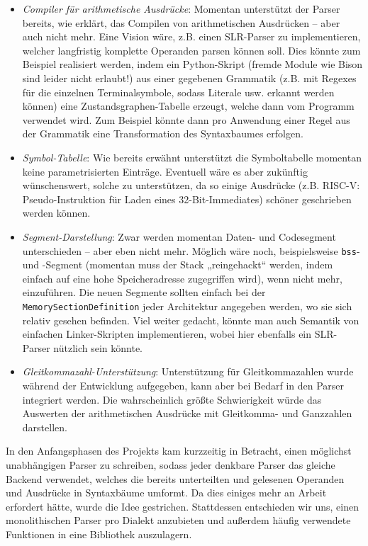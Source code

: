 \begin{itemize}
\item \emph{Compiler für arithmetische Ausdrücke}: Momentan unterstützt der Parser bereits, wie erklärt, das Compilen von arithmetischen Ausdrücken – aber auch nicht mehr. Eine Vision wäre, z.B. einen SLR-Parser zu implementieren, welcher langfristig komplette Operanden parsen können soll. Dies könnte zum Beispiel realisiert werden, indem ein Python-Skript (fremde Module wie Bison sind leider nicht erlaubt!) aus einer gegebenen Grammatik (z.B. mit Regexes für die einzelnen Terminalsymbole, sodass Literale usw. erkannt werden können) eine Zustandsgraphen-Tabelle erzeugt, welche dann vom Programm verwendet wird. Zum Beispiel könnte dann pro Anwendung einer Regel aus der Grammatik eine Transformation des Syntaxbaumes erfolgen.
\item \emph{Symbol-Tabelle}: Wie bereits erwähnt unterstützt die Symboltabelle momentan keine parametrisierten Einträge. Eventuell wäre es aber zukünftig wünschenswert, solche zu unterstützen, da so einige Ausdrücke (z.B. RISC-V: Pseudo-Instruktion für Laden eines 32-Bit-Immediates) schöner geschrieben werden können.
\item \emph{Segment-Darstellung}: Zwar werden momentan Daten- und Codesegment unterschieden – aber eben nicht mehr. Möglich wäre noch, beispielsweise \texttt{bss}- und -Segment (momentan muss der Stack „reingehackt“ werden, indem einfach auf eine hohe Speicheradresse zugegriffen wird), wenn nicht mehr, einzuführen. Die neuen Segmente sollten einfach bei der \texttt{MemorySectionDefinition} jeder Architektur angegeben werden, wo sie sich relativ gesehen befinden. Viel weiter gedacht, könnte man auch Semantik von einfachen Linker-Skripten implementieren, wobei hier ebenfalls ein SLR-Parser nützlich sein könnte.
\item \emph{Gleitkommazahl-Unterstützung}: Unterstützung für Gleitkommazahlen wurde während der Entwicklung aufgegeben, kann aber bei Bedarf in den Parser integriert werden. Die wahrscheinlich größte Schwierigkeit würde das Auswerten der arithmetischen Ausdrücke mit Gleitkomma- und Ganzzahlen darstellen.
\end{itemize}

In den Anfangsphasen des Projekts kam kurzzeitig in Betracht, einen möglichst unabhängigen Parser zu schreiben, sodass jeder denkbare Parser das gleiche Backend verwendet, welches die bereits unterteilten und gelesenen Operanden und Ausdrücke in Syntaxbäume umformt. Da dies einiges mehr an Arbeit erfordert hätte, wurde die Idee gestrichen. Stattdessen entschieden wir uns, einen monolithischen Parser pro Dialekt anzubieten und außerdem häufig verwendete Funktionen in eine Bibliothek auszulagern.

